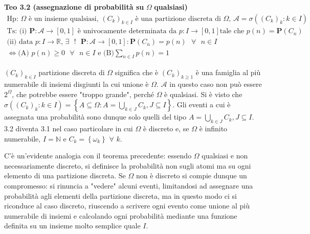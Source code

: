 \documentclass{article}
\begin{document}
\textbf{Teo 3.2 (assegnazione di probabilit\`{a} su }$\Omega $ \textbf{%
qualsiasi)}%
\begin{gather*}
\text{Hp: }\Omega \text{ \`{e} un insieme qualsiasi, }\left( C_{k}\right)
_{k\in I}\text{ \`{e} una partizione discreta di }\Omega \text{, }\mathcal{A}%
=\sigma \left( \left( C_{k}\right) _{k}:k\in I\right) \\
\text{Ts: (i) }\mathbf{P}:\mathcal{A}\rightarrow \left[ 0,1\right] \text{ 
\`{e} univocamente determinata da }p:I\rightarrow \left[ 0,1\right] \text{
tale che }p\left( n\right) =\mathbf{P}\left( C_{n}\right) \\
\text{(ii) data }p:I\rightarrow 
\mathbb{R}
\text{, }\exists \text{ }!\text{ }\mathbf{P}:\mathcal{A}\rightarrow \left[
0,1\right] :\mathbf{P}\left( C_{n}\right) =p\left( n\right) \text{ }\forall 
\text{ }n\in I \\
\Longleftrightarrow \text{(A) }p\left( n\right) \geq 0\text{ }\forall \text{ 
}n\in I\text{ e (B)}\sum_{n\in I}p\left( n\right) =1
\end{gather*}

$\left( C_{k}\right) _{k\in I}$ partizione discreta di $\Omega $ significa
che \`{e} $\left( C_{k}\right) _{k\geq 1}$ \`{e} una famiglia al pi\`{u}
numerabile di insiemi disgiunti la cui unione \`{e} $\Omega $. $\mathcal{A}$
in questo caso non pu\`{o} essere $2^{\Omega }$, che potrebbe essere "troppo
grande", perch\'{e} $\Omega $ \`{e} qualsiasi. Si \`{e} visto che $\sigma
\left( \left( C_{k}\right) _{k}:k\in I\right) =\left\{ A\subseteq \Omega
:A=\bigcup_{k\in J}C_{k},J\subseteq I\right\} $. Gli eventi a cui \`{e}
assegnata una probabilit\`{a} sono dunque solo quelli del tipo $%
A=\bigcup_{k\in J}C_{k},J\subseteq I$. 3.2 diventa 3.1 nel caso particolare
in cui $\Omega $ \`{e} discreto e, se $\Omega $ \`{e} infinito numerabile, $%
I=%
\mathbb{N}
$ e $C_{k}=\left\{ \omega _{k}\right\} $ $\forall $ $k$.

C'\`{e} un'evidente analogia con il teorema precedente: essendo $\Omega $
qualsiasi e non necessariamente discreto, si definisce la probabilit\`{a}
non sugli atomi ma su ogni elemento di una partizione discreta. Se $\Omega $
non \`{e} discreto si compie dunque un compromesso: si rinuncia a "vedere"
alcuni eventi, limitandosi ad assegnare una probabilit\`{a} agli elementi
della partizione discreta, ma in questo modo ci si riconduce al caso
discreto, riuscendo a scrivere ogni evento come unione al pi\`{u} numerabile
di insiemi e calcolando ogni probabilit\`{a} mediante una funzione definita
su un insieme molto semplice quale $I$.
\end{document}
